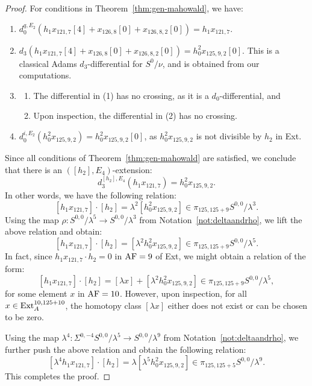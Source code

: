 \begin{proof}
For conditions in Theorem~\ref{thm:gen-mahowald}, we have:
\begin{enumerate}
      \item $d_0^{q, E_2}(h_1 x_{121,7} [4] + x_{126,8}[0] + x_{126,8,2}[0]) = h_1 x_{121,7}$.
      \item $d_3 (h_1 x_{121,7} [4] + x_{126,8}[0] + x_{126,8,2}[0]) = h_0^2 x_{125,9,2} [0]$. This is a classical Adams $d_3$-differential for $S^0/\nu$, and is obtained from our computations.
      \item 
      \begin{enumerate}
          \item The differential in (1) has no crossing, as it is a $d_0$-differential, and
          \item Upon inspection, the differential in (2) has no crossing. 
      \end{enumerate}
      \item 
      $d_0^{i, E_2} (h_0^2 x_{125,9,2}) = h_0^2 x_{125,9,2}[0]$, as $h_0^2 x_{125,9,2}$ is not divisible by $h_2$ in Ext.
      \end{enumerate}
    Since all conditions of Theorem~\ref{thm:gen-mahowald} are  satisfied, we conclude that there is an $([h_2], E_4)$-extension:
        $$d_3^{[h_2], E_4} (h_1 x_{121,7}) = h_0^2 x_{125,9,2}.$$
In other words, we have the following relation:
      $$[h_1 x_{121,7}] \cdot [h_2] = \lambda^2 [h_0^2 x_{125,9,2}] \in \pi_{125,125+9} S^{0,0}/\lambda^3.$$  
Using the map $\rho:S^{0,0}/\lambda^5 \rightarrow S^{0,0}/\lambda^3$ from Notation~\ref{not:deltaandrho}, we lift the above relation and obtain:
$$[h_1 x_{121,7}] \cdot [h_2] = [\lambda^2 h_0^2 x_{125,9,2}] \in \pi_{125,125+9} S^{0,0}/\lambda^5.$$
In fact, since $h_1 x_{121,7} \cdot h_2 = 0$ in $\mathrm{AF}=9$ of Ext, we might obtain a relation of the form:
$$[h_1 x_{121,7}] \cdot [h_2] = [\lambda x] + [\lambda^2 h_0^2 x_{125,9,2}] \in \pi_{125,125+9} S^{0,0}/\lambda^5,$$
for some element $x$ in $\mathrm{AF}=10$. However, upon inspection, for all $x \in  \mathrm{Ext}_A^{10,125+10}$, the homotopy class $[\lambda x]$ either does not exist or can be chosen to be zero.




Using the map $\lambda^4: \Sigma^{0,-4}S^{0,0}/\lambda^5 \rightarrow S^{0,0}/\lambda^9$ from Notation~\ref{not:deltaandrho}, we further push the above relation and obtain the following relation:
$$[\lambda^4 h_1 x_{121,7}] \cdot [h_2] = \lambda [\lambda^5 h_0^2 x_{125,9,2}] \in \pi_{125,125+5} S^{0,0}/\lambda^9.$$
This completes the proof.
\end{proof}







